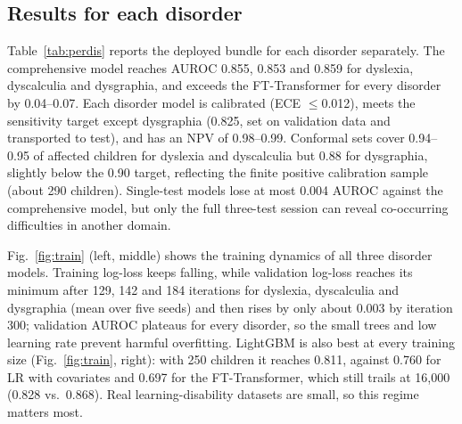\documentclass[conference]{IEEEtran}
\begin{document}
\subsection{Results for each disorder}
Table~\ref{tab:perdis} reports the deployed bundle for each disorder separately. The comprehensive model reaches AUROC 0.855, 0.853 and 0.859 for dyslexia, dyscalculia and dysgraphia, and exceeds the FT-Transformer for every disorder by 0.04--0.07. Each disorder model is calibrated (ECE $\leq$0.012), meets the sensitivity target except dysgraphia (0.825, set on validation data and transported to test), and has an NPV of 0.98--0.99. Conformal sets cover 0.94--0.95 of affected children for dyslexia and dyscalculia but 0.88 for dysgraphia, slightly below the 0.90 target, reflecting the finite positive calibration sample (about 290 children). Single-test models lose at most 0.004 AUROC against the comprehensive model, but only the full three-test session can reveal co-occurring difficulties in another domain.

Fig.~\ref{fig:train} (left, middle) shows the training dynamics of all three disorder models. Training log-loss keeps falling, while validation log-loss reaches its minimum after 129, 142 and 184 iterations for dyslexia, dyscalculia and dysgraphia (mean over five seeds) and then rises by only about 0.003 by iteration 300; validation AUROC plateaus for every disorder, so the small trees and low learning rate prevent harmful overfitting. LightGBM is also best at every training size (Fig.~\ref{fig:train}, right): with 250 children it reaches 0.811, against 0.760 for LR with covariates and 0.697 for the FT-Transformer, which still trails at 16{,}000 (0.828 vs.\ 0.868). Real learning-disability datasets are small, so this regime matters most.
\end{document}
